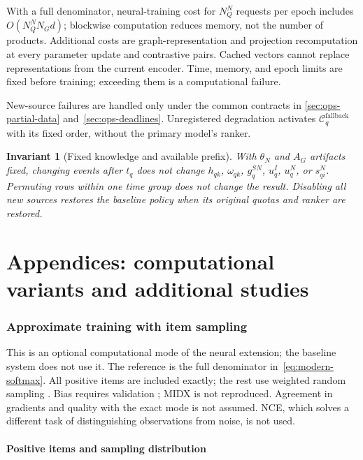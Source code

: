 \documentclass[12pt,a4paper]{article}
\theoremstyle{plainru}
\newtheorem{invariant}{Invariant}[section]
\begin{document}
With a full denominator, neural-training cost for
$N_Q^N$ requests per epoch includes $O(N_Q^NN_Gd)$;
blockwise computation reduces memory, not the number of products.
Additional costs are graph-representation and projection recomputation at every
parameter update and contrastive pairs. Cached vectors
cannot replace representations from the current encoder.
Time, memory, and epoch limits are fixed before training;
exceeding them is a computational failure.

New-source failures are handled only under the common contracts in
\ref{sec:ops-partial-data} and~\ref{sec:ops-deadlines}. Unregistered
degradation activates $\mathcal C_q^{\mathrm{fallback}}$ with its fixed
order, without the primary model's ranker.

\begin{invariant}[Fixed knowledge and available prefix]
With $\theta_N$ and $A_G$ artifacts fixed, changing events
after $t_q$ does not change $h_{qk}$, $\omega_{qk}$, $g_q^{SN}$,
$u_q^I$, $u_q^N$, or $s_{qi}^N$.
Permuting rows within one time group does not change the result.
Disabling all new sources restores the baseline policy
when its original quotas and ranker are restored.
\end{invariant}

\clearpage\part{Appendices: computational variants and additional studies}\label{part:appendices}
\appendix
\section{Approximate training with item sampling}
\label{sec:sampled-training}
\label{sec:sampled-overview}

This is an optional computational mode of the neural extension;
the baseline system does not use it. The reference is the full
denominator in~\eqref{eq:modern-softmax}. All positive items
are included exactly; the rest use weighted random
sampling \cite{candidatesampling}. Bias requires validation
\cite{sampledsoftmax2025}; MIDX is not reproduced.
Agreement in gradients and quality with the exact mode is not assumed.
NCE, which solves a different task of distinguishing observations from noise, is not used.

\subsection{Positive items and sampling distribution}
\label{sec:sampled-proposal}
\end{document}
